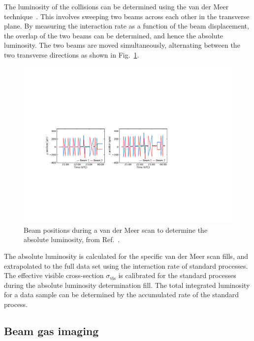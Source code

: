 The luminosity of the collisions can be determined using the van der Meer technique~\cite{VanDerMeer}. This involves sweeping two beams across each other in the transverse plane. By measuring the interaction rate as a function of the beam displacement, the overlap of the two beams can be determined, and hence the absolute luminosity. The two beams are moved simultaneously, alternating between the two transverse directions as shown in Fig.~\ref{fig:Dec_vdm_scan}.

\begin{figure}[!h]
    \centering
    \includegraphics[width=1.0\textwidth]{figs/Detector/lumi_plots.pdf}
    \caption{Beam positions during a van der Meer scan to determine the absolute luminosity, from Ref.~\cite{1748-0221-9-12-P12005}.}
    \label{fig:Dec_vdm_scan}   
\end{figure}
The absolute luminosity is calculated for the specific van der Meer scan fills, and extrapolated to the full data set using the interaction rate of standard processes. The effective visible cross-section $\sigma_{\text{vis}}$ is calibrated for the standard processes during the absolute luminosity determination fill. The total integrated luminosity for a data sample can be determined by the accumulated rate of the standard process.  


\subsection{Beam gas imaging}

